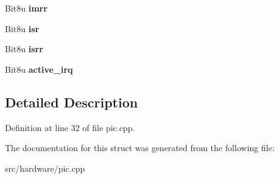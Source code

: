 \begin{DoxyCompactItemize}
\item 
\hypertarget{structPIC__Controller_a138308d81e33e95b85c37931a67427d0}{Bit8u {\bfseries imrr}}\label{structPIC__Controller_a138308d81e33e95b85c37931a67427d0}

\item 
\hypertarget{structPIC__Controller_a659d63dbd7cba92eed18a49421d94bec}{Bit8u {\bfseries isr}}\label{structPIC__Controller_a659d63dbd7cba92eed18a49421d94bec}

\item 
\hypertarget{structPIC__Controller_ae3d8234bf6bc4cb37b27e961fee92f72}{Bit8u {\bfseries isrr}}\label{structPIC__Controller_ae3d8234bf6bc4cb37b27e961fee92f72}

\item 
\hypertarget{structPIC__Controller_abbe151d9c4816820e6e8e2fb3f5c2b8f}{Bit8u {\bfseries active\-\_\-irq}}\label{structPIC__Controller_abbe151d9c4816820e6e8e2fb3f5c2b8f}

\end{DoxyCompactItemize}


\subsection{Detailed Description}


Definition at line 32 of file pic.\-cpp.



The documentation for this struct was generated from the following file\-:\begin{DoxyCompactItemize}
\item 
src/hardware/pic.\-cpp\end{DoxyCompactItemize}
